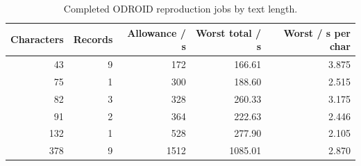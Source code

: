 \begin{table}[H]\centering\small
\begin{tabular}{rrrrr}\toprule
\textbf{Characters} & \textbf{Records} & \textbf{Allowance / s} & \textbf{Worst total / s} & \textbf{Worst / s per char}\\\midrule
43 & 9 & 172 & 166.61 & 3.875\\
75 & 1 & 300 & 188.60 & 2.515\\
82 & 3 & 328 & 260.33 & 3.175\\
91 & 2 & 364 & 222.63 & 2.446\\
132 & 1 & 528 & 277.90 & 2.105\\
378 & 9 & 1512 & 1085.01 & 2.870\\
\bottomrule\end{tabular}
\caption{Completed ODROID reproduction jobs by text length.}\label{tab:res-r3-confirmed}
\end{table}

